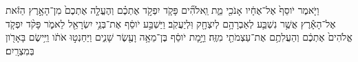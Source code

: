 \documentclass{openreader}
\begin{document}
וַיֹּ֤אמֶר יֹוסֵף֙ אֶל־אֶחָ֔יו אָנֹכִ֖י מֵ֑ת וֵֽאלֹהִ֞ים פָּקֹ֧ד יִפְקֹ֣ד אֶתְכֶ֗ם וְהֶעֱלָ֤ה אֶתְכֶם֙ מִן־הָאָ֣רֶץ הַזֹּ֔את אֶל־הָאָ֕רֶץ אֲשֶׁ֥ר נִשְׁבַּ֛ע לְאַבְרָהָ֥ם לְיִצְחָ֖ק וּֽלְיַעֲקֹֽב׃ 
וַיַּשְׁבַּ֣ע יֹוסֵ֔ף אֶת־בְּנֵ֥י יִשְׂרָאֵ֖ל לֵאמֹ֑ר פָּקֹ֨ד יִפְקֹ֤ד אֱלֹהִים֙ אֶתְכֶ֔ם וְהַעֲלִתֶ֥ם אֶת־עַצְמֹתַ֖י מִזֶּֽה׃ 
וַיָּ֣מָת יֹוסֵ֔ף בֶּן־מֵאָ֥ה וָעֶ֖שֶׂר שָׁנִ֑ים וַיַּחַנְט֣וּ אֹתֹ֔ו וַיִּ֥ישֶׂם בָּאָרֹ֖ון בְּמִצְרָֽיִם׃ 
\end{document}
